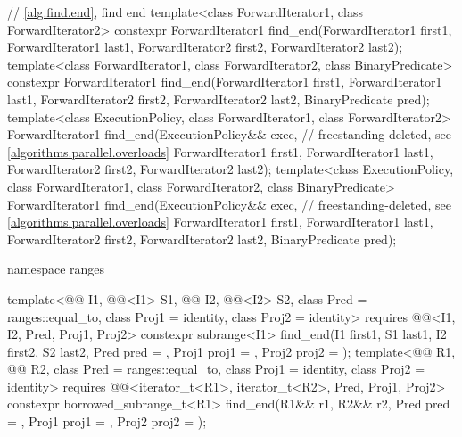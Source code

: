 \begin{codeblock}
{  // \ref{alg.find.end}, find end
  template<class ForwardIterator1, class ForwardIterator2>
    constexpr ForwardIterator1
      find_end(ForwardIterator1 first1, ForwardIterator1 last1,
               ForwardIterator2 first2, ForwardIterator2 last2);
  template<class ForwardIterator1, class ForwardIterator2, class BinaryPredicate>
    constexpr ForwardIterator1
      find_end(ForwardIterator1 first1, ForwardIterator1 last1,
               ForwardIterator2 first2, ForwardIterator2 last2,
               BinaryPredicate pred);
  template<class ExecutionPolicy, class ForwardIterator1, class ForwardIterator2>
    ForwardIterator1
      find_end(ExecutionPolicy&& exec,                          // freestanding-deleted, see \ref{algorithms.parallel.overloads}
               ForwardIterator1 first1, ForwardIterator1 last1,
               ForwardIterator2 first2, ForwardIterator2 last2);
  template<class ExecutionPolicy, class ForwardIterator1,
           class ForwardIterator2, class BinaryPredicate>
    ForwardIterator1
      find_end(ExecutionPolicy&& exec,                          // freestanding-deleted, see \ref{algorithms.parallel.overloads}
               ForwardIterator1 first1, ForwardIterator1 last1,
               ForwardIterator2 first2, ForwardIterator2 last2,
               BinaryPredicate pred);

  namespace ranges {
    template<@@ I1, @@<I1> S1, @@ I2, @@<I2> S2,
             class Pred = ranges::equal_to, class Proj1 = identity, class Proj2 = identity>
      requires @@<I1, I2, Pred, Proj1, Proj2>
      constexpr subrange<I1>
        find_end(I1 first1, S1 last1, I2 first2, S2 last2, Pred pred = {},
                 Proj1 proj1 = {}, Proj2 proj2 = {});
    template<@@ R1, @@ R2,
             class Pred = ranges::equal_to, class Proj1 = identity, class Proj2 = identity>
      requires @@<iterator_t<R1>, iterator_t<R2>, Pred, Proj1, Proj2>
      constexpr borrowed_subrange_t<R1>
        find_end(R1&& r1, R2&& r2, Pred pred = {},
                 Proj1 proj1 = {}, Proj2 proj2 = {});

}}
\end{codeblock}
